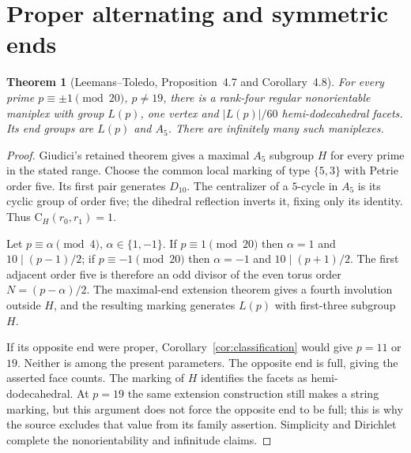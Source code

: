 \documentclass[11pt]{article}
\newtheorem{theorem}{Theorem}
\newcommand{\CG}{\mathrm C}
\begin{document}
\section{Proper alternating and symmetric ends}
\begin{theorem}[Leemans--Toledo, Proposition~4.7 and Corollary~4.8]
\label{thm:A5}
For every prime $p\equiv\pm1\pmod{20}$, $p\ne19$, there is a rank-four
regular nonorientable maniplex with group $L(p)$, one vertex and
$|L(p)|/60$ hemi-dodecahedral facets. Its end groups are $L(p)$ and
$A_5$. There are infinitely many such maniplexes.
\end{theorem}
\begin{proof}
Giudici's retained theorem gives a maximal $A_5$ subgroup $H$ for every
prime in the stated range. Choose the common local marking of type $\{5,3\}$
with Petrie order five. Its first pair generates $D_{10}$.
The centralizer of a $5$-cycle in $A_5$ is its cyclic group of order five;
the dihedral reflection inverts it, fixing only its identity. Thus
$\CG_H(r_0,r_1)=1$.

Let $p\equiv\alpha\pmod4$, $\alpha\in\{1,-1\}$. If
$p\equiv1\pmod{20}$ then $\alpha=1$ and $10\mid(p-1)/2$; if
$p\equiv-1\pmod{20}$ then $\alpha=-1$ and $10\mid(p+1)/2$.
The first adjacent order five is therefore an odd divisor of the even
torus order $N=(p-\alpha)/2$. The maximal-end extension theorem gives
a fourth involution outside $H$, and the resulting marking generates
$L(p)$ with first-three subgroup $H$.

If its opposite end were proper, Corollary~\ref{cor:classification}
would give $p=11$ or $19$. Neither is among the present parameters.
The opposite end is full, giving the asserted face counts. The marking
of $H$ identifies the facets as hemi-dodecahedral. At $p=19$ the same
extension construction still makes a string marking, but this argument
does not force the opposite end to be full; this is why the source
excludes that value from its family assertion. Simplicity and Dirichlet
complete the nonorientability and infinitude claims.
\end{proof}
\end{document}
